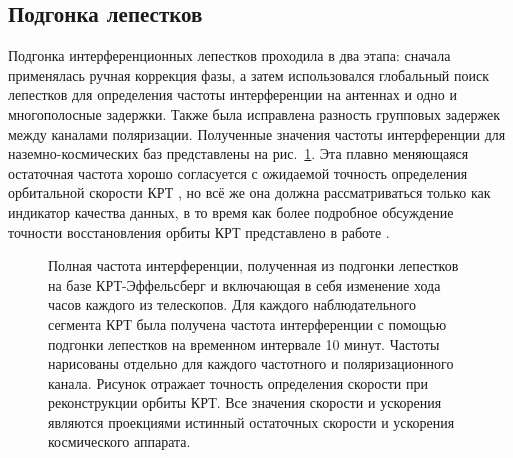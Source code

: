 \subsection{Подгонка лепестков}

Подгонка интерференционных лепестков проходила в два этапа: сначала применялась ручная коррекция
фазы, а затем использовался глобальный поиск лепестков для определения частоты интерференции на
антеннах и одно и многополосные задержки. Также была исправлена разность групповых задержек между
каналами поляризации. Полученные значения частоты интерференции для наземно-космических баз
представлены на рис.~\ref{fig:0642_rate}. Эта плавно меняющаяся остаточная частота
хорошо согласуется с ожидаемой точность определения орбитальной скорости КРТ
\cite{Kardashev_2013_rus}, но всё же она должна
рассматриваться только как индикатор качества данных, в то время как более подробное обсуждение
точности восстановления орбиты КРТ представлено в работе \cite{Duev_2015}.

\begin{figure}[tbh]
 \caption{Полная частота интерференции, полученная из подгонки лепестков на базе КРТ-Эффельсберг и
включающая в себя изменение хода часов каждого из телескопов. Для каждого наблюдательного сегмента
КРТ была получена частота интерференции с помощью подгонки лепестков на временном интервале 10
минут. Частоты нарисованы отдельно для каждого частотного и поляризационного канала. Рисунок
отражает точность определения скорости при реконструкции орбиты КРТ. Все значения скорости и
ускорения являются проекциями истинный остаточных скорости и ускорения космического аппарата.}
 \label{fig:0642_rate}
\end{figure}


